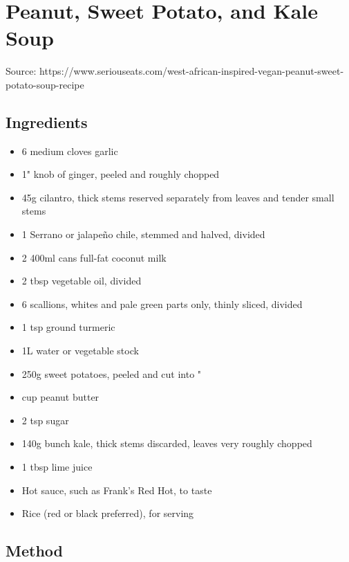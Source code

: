 \section{Peanut, Sweet Potato, and Kale Soup}


Source: https://www.seriouseats.com/west-african-inspired-vegan-peanut-sweet-potato-soup-recipe

\subsection{Ingredients}

\begin{itemize}
    \item 6 medium cloves garlic
    \item 1" knob of ginger, peeled and roughly chopped
    \item 45g cilantro, thick stems reserved separately from leaves and tender small stems
    \item 1 Serrano or jalapeño chile, stemmed and halved, divided
    \item 2 400ml cans full-fat coconut milk
    \item 2 tbsp vegetable oil, divided
    \item 6 scallions, whites and pale green parts only, thinly sliced, divided
    \item 1 tsp ground turmeric
    \item 1L water or vegetable stock
    \item 250g sweet potatoes, peeled and cut into "
    \item {} cup peanut butter
    \item 2 tsp sugar
    \item 140g bunch kale, thick stems discarded, leaves very roughly chopped
    \item 1 tbsp lime juice
    \item Hot sauce, such as Frank's Red Hot, to taste
    \item Rice (red or black preferred), for serving
\end{itemize}

\subsection{Method}

